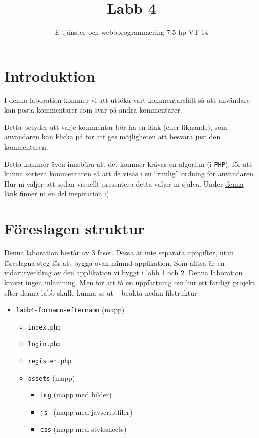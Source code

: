 \documentclass[12pt]{article}
\date{}
\title{ Labb 4 }
\author{ E-tjänster och webbprogrammering 7.5 hp VT-14 }
\begin{document}
\maketitle
\vspace{-2em}



\section{Introduktion}
I denna laboration kommer vi att uttöka vårt kommentarsfält så att användare kan posta kommentarer som svar på andra kommentarer.

Detta betyder att varje kommentar bör ha en länk (eller liknande), som användaren kan klicka på för att ges möjligheten att besvara just den kommentaren.

Detta kommer även innebära att det kommer krävas en algoritm (i \texttt{PHP}), för att kunna sortera kommentaren så att de visas i en ``rimlig'' ordning för användaren. Hur ni väljer att sedan visuellt presentera detta väljer ni själva. Under \href{http://designm.ag/designer-showcase/well-designed-threaded-comments-sections-in-webpages/}{denna länk} finner ni en del inspiration :)



\section{Föreslagen struktur}
Denna laboration består av 3 faser. Dessa är inte separata uppgifter, utan föreslagna steg för att bygga ovan nämnd applikation. Som alltså är en vidarutveckling av den applikation vi byggt i labb 1 och 2. Denna laboration kräver ingen inlämning. Men för att få en uppfattning om hur ett färdigt projekt efter denna labb skulle kunna se ut -- beakta nedan filstruktur.
\begin{itemize}
  \item \texttt{labb4-fornamn-efternamn} (mapp)
  \begin{itemize}
    \item \texttt{index.php}
    \item \texttt{login.php}
    \item \texttt{register.php}
    \item \texttt{assets} (mapp)
    \begin{itemize}
      \item \texttt{img} (mapp med bilder)
      \item \texttt{js } (mapp med javscriptfiler)
      \item \texttt{css} (mapp med stylesheets)
    \end{itemize}
  \end{itemize}
\end{itemize}
\end{document}
